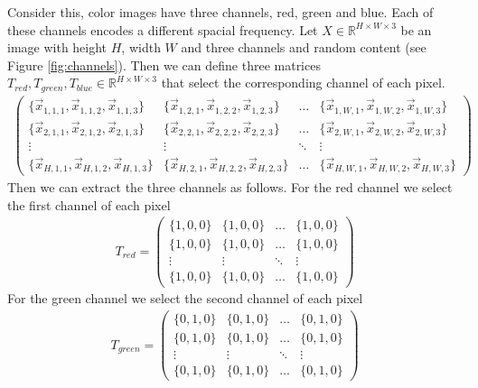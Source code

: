 Consider this, color images have three channels, red, green and blue. Each of these channels encodes a different spacial frequency.
Let $X \in \mathbb{R}^{H \times W \times 3}$ be an image with height $H$, width $W$ and three channels and random content (see Figure \ref{fig:channels}).
Then we can define three matrices $T_{red}, T_{green}, T_{blue} \in \mathbb{R}^{H \times W \times 3}$ that select the corresponding channel of each pixel.
\begin{align}
  \begin{pmatrix}
    \{\vec{x}_{1,1,1},\vec{x}_{1,1,2},\vec{x}_{1,1,3}\}
    & \{\vec{x}_{1,2,1},\vec{x}_{1,2,2},\vec{x}_{1,2,3}\}
    & \dots
    & \{\vec{x}_{1,W,1},\vec{x}_{1,W,2},\vec{x}_{1,W,3}\} \\
    \{\vec{x}_{2,1,1},\vec{x}_{2,1,2},\vec{x}_{2,1,3}\}
    & \{\vec{x}_{2,2,1},\vec{x}_{2,2,2},\vec{x}_{2,2,3}\}
    & \dots
    & \{\vec{x}_{2,W,1},\vec{x}_{2,W,2},\vec{x}_{2,W,3}\} \\
    \vdots & \vdots & \ddots & \vdots \\
    \{\vec{x}_{H,1,1},\vec{x}_{H,1,2},\vec{x}_{H,1,3}\}
    & \{\vec{x}_{H,2,1},\vec{x}_{H,2,2},\vec{x}_{H,2,3}\}
    & \dots
    & \{\vec{x}_{H,W,1},\vec{x}_{H,W,2},\vec{x}_{H,W,3}\}
  \end{pmatrix}
\end{align}
Then we can extract the three channels as follows.
For the red channel we select the first channel of each pixel
\begin{align}
  T_{red} = \begin{pmatrix}
    \{1, 0, 0\}
    & \{1, 0, 0\}
    & \dots
    & \{1, 0, 0\}\\
    \{1, 0, 0\}
    & \{1, 0, 0\}
    & \dots
    & \{1, 0, 0\}\\
    \vdots & \vdots & \ddots & \vdots \\
    \{1, 0, 0\}
    & \{1, 0, 0\}
    & \dots
    & \{1, 0, 0\}
  \end{pmatrix}
\end{align}
For the green channel we select the second channel of each pixel
\begin{align}
  T_{green} = \begin{pmatrix}
    \{0, 1, 0\}
    & \{0, 1, 0\}
    & \dots
    & \{0, 1, 0\}\\
    \{0, 1, 0\}
    & \{0, 1, 0\}
    & \dots
    & \{0, 1, 0\}\\
    \vdots & \vdots & \ddots & \vdots \\
    \{0, 1, 0\}
    & \{0, 1, 0\}
    & \dots
    & \{0, 1, 0\}
  \end{pmatrix}
\end{align}
